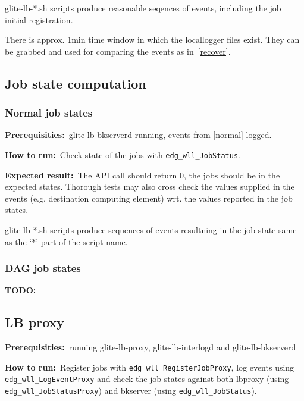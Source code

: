 \documentclass{egee}
\def\req{\noindent\textbf{Prerequisities:}}
\def\how{\noindent\textbf{How to run:}}
\def\result{\noindent\textbf{Expected result:}}
\def\path#1{{\normalfont\textsf{#1}}}
\def\code#1{\texttt{#1}}
\def\todo#1{\textbf{TODO:} #1}
\begin{document}
\begin{hints}
\path{glite-lb-*.sh} scripts produce reasonable seqences of events, including
the job initial registration.

There is approx. 1min time window in which the locallogger files exist.
They can be grabbed and used for comparing the events as in~\ref{recover}.

\end{hints}

\subsection{Job state computation}

\subsubsection{Normal job states}
\label{state}
\req\ \path{glite-lb-bkserverd} running, events from \ref{normal} logged.

\how\ Check state of the jobs with \code{edg\_wll\_JobStatus}.

\result\ The API call should return 0, the jobs should be in the expected
states. Thorough tests may also cross check the values supplied in the
events (e.g. destination computing element) wrt. the values reported in the job states.

\begin{hints}
\path{glite-lb-*.sh} scripts produce sequences of events resultning
in the job state same as the `*' part of the script name.
\end{hints}

\subsubsection{DAG job states}
\todo{}

\subsection{LB proxy}
\req\ running \path{glite-lb-proxy}, \path{glite-lb-interlogd} and
\path{glite-lb-bkserverd}

\how\ Register jobs with \code{edg\_wll\_RegisterJobProxy}, log events
using \code{edg\_wll\_LogEventProxy} and check the job states against
both lbproxy (using \code{edg\_wll\_JobStatusProxy}) and bkserver
(using \code{edg\_wll\_JobStatus}).
\end{document}
